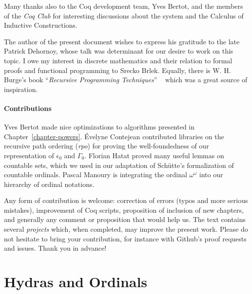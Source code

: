 \documentclass[a4paper]{book}
\begin{document}
Many thanks also to the Coq development team, Yves Bertot, and the members of the \emph{Coq Club} for interesting discussions about the \coq{} system and the Calculus of Inductive Constructions.

The author of the present document wishes to express his gratitude to the late Patrick Dehornoy, whose talk  was determinant for our desire to work on this topic.
I owe my interest in discrete mathematics and their relation to formal proofs and functional programming  to Srecko Brlek.  Equally, there is W. H. Burge's book ``\emph{Recursive Programming Techniques}'' ~\cite{burge} which was a great  source of inspiration.



\subsection{Contributions}

Yves Bertot made nice optimizations  to algorithms presented in Chapter~\ref{chapter-powers}.
\'Evelyne Contejean contributed libraries on the recursive path ordering (\emph{rpo}) for proving the well-foundedness of our representation of $\epsilon_0$ and $\Gamma_0$.
Florian Hatat proved many useful lemmas on countable sets, which we used in our adaptation of Schütte's formalization of countable ordinals. Pascal Manoury is integrating the ordinal $\omega^\omega$ into our hierarchy of ordinal notations.



\label{sec:orgheadline2}

Any form of contribution  is welcome: correction of errors (typos and more serious mistakes), improvement of
Coq scripts, proposition of inclusion of new chapters, and generally any
comment or proposition that would help us. The text contains several \emph{projects} which, when completed, may improve the present work.
Please do not hesitate to bring your contribution, for instance with Github's proof requests and issues. Thank you in advance!






\part{Hydras and Ordinals}
\end{document}
